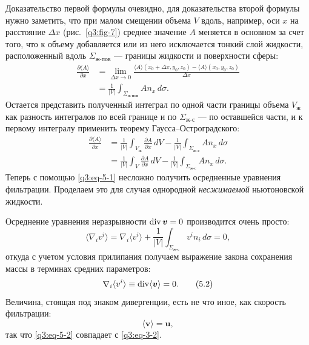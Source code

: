 Доказательство первой формулы очевидно, для доказательства второй формулы нужно заметить, что при малом смещении объема $V$ вдоль, например, оси $x$ на расстояние $\Delta x$ (рис.~\ref{q3:fig-7}) среднее значение $A$ меняется в основном за счет того, что к объему добавляется или из него
исключается тонкий слой жидкости, расположенный вдоль $\Sigma_{\text{ж-пов}}$ --- границы жидкости и поверхности сферы:
\[
\begin{aligned}
\frac{\partial\langle A\rangle}{\partial x}
&=\lim_{\Delta x\to0}\frac{\langle A\rangle(x_0+\Delta x,y_0,z_0)-\langle A\rangle(x_0,y_0,z_0)}{\Delta x}\\
&=\frac{1}{|V|}\int_{\Sigma_{\text{ж-пов}}}An_x\,d\sigma.
\end{aligned}
\]
Остается представить полученный интеграл по одной части границы объема $V_{\text{ж}}$ как разность интегралов по всей границе и по $\Sigma_{\text{ж-с}}$ --- по оставшейся части, и к первому интегралу применить теорему Гаусса--Остроградского:
\[
\begin{aligned}
\frac{\partial\langle A\rangle}{\partial x}
&=\frac{1}{|V|}\int_{V_{\text{ж}}}\frac{\partial A}{\partial x}\,dV-\frac{1}{|V|}\int_{\Sigma_{\text{ж-с}}}An_x\,d\sigma\\
&=\frac{1}{|V|}\int_V\frac{\partial A}{\partial x}\,dV-\frac{1}{|V|}\int_{\Sigma_{\text{ж-с}}}An_x\,d\sigma.
\end{aligned}
\]
Теперь с помощью \eqref{q3:eq-5-1} несложно получить осредненные уравнения фильтрации. Проделаем это для случая однородной \textit{несжимаемой} ньютоновской жидкости.

Осреднение уравнения неразрывности $\operatorname{div}\boldsymbol{v}=0$ производится очень просто:
\[
\langle\nabla_iv^i\rangle=\nabla_i\langle v^i\rangle+\frac{1}{|V|}\int_{\Sigma_{\text{ж-с}}}v^in_i\,d\sigma=0,
\]
откуда с учетом условия прилипания получаем выражение закона сохранения массы в терминах средних параметров:
\begin{equation}
\nabla_i\langle v^i\rangle\equiv\operatorname{div}\langle\boldsymbol{v}\rangle=0.
\tag{5.2}\label{q3:eq-5-2}
\end{equation}
Величина, стоящая под знаком дивергенции, есть не что иное, как скорость фильтрации:
\[
\langle\boldsymbol{v}\rangle=\boldsymbol{u},
\]
так что \eqref{q3:eq-5-2} совпадает с \eqref{q3:eq-3-2}.

